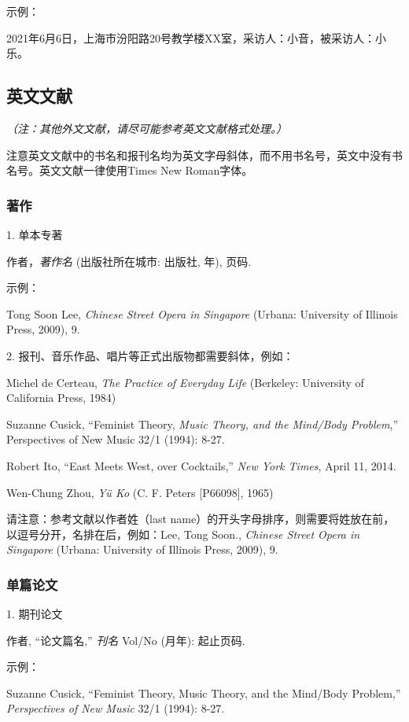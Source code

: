 示例：

2021年6月6日，上海市汾阳路20号教学楼XX室，采访人：小音，被采访人：小乐。

\subsection{英文文献}

\textit{（注：其他外文文献，请尽可能参考英文文献格式处理。）}

注意英文文献中的书名和报刊名均为英文字母斜体，而不用书名号，英文中没有书名号。英文文献一律使用Times New Roman字体。

\subsubsection{著作}

1. 单本专著

作者，\textit{著作名} (出版社所在城市: 出版社, 年), 页码.

示例：

Tong Soon Lee, \textit{Chinese Street Opera in Singapore} (Urbana: University of Illinois Press, 2009), 9.

2. 报刊、音乐作品、唱片等正式出版物都需要斜体，例如：

Michel de Certeau, \textit{The Practice of Everyday Life} (Berkeley: University of California Press, 1984)

Suzanne Cusick, “Feminist Theory, \textit{Music Theory, and the Mind/Body Problem},” Perspectives of New Music 32/1 (1994): 8-27.

Robert Ito, “East Meets West, over Cocktails,” \textit{New York Times}, April 11, 2014.

Wen-Chung Zhou, \textit{Yü Ko} (C. F. Peters [P66098], 1965)

请注意：参考文献以作者姓（last name）的开头字母排序，则需要将姓放在前，以逗号分开，名排在后，例如：Lee, Tong Soon., \textit{Chinese Street Opera in Singapore} (Urbana: University of Illinois Press, 2009), 9.

\subsubsection{单篇论文}

1. 期刊论文

作者, “论文篇名,” \textit{刊名 }Vol/No (月年): 起止页码.

示例：

Suzanne Cusick, “Feminist Theory, Music Theory, and the Mind/Body Problem,” \textit{Perspectives of New Music} 32/1 (1994): 8-27.

